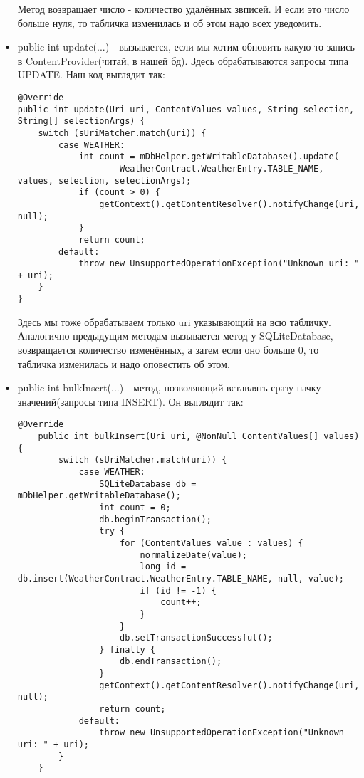 \documentclass[12 pt]{article}
\begin{document}
\begin{itemize}
	    Метод возвращает число - количество удалённых звписей. И если это число больше нуля, то табличка изменилась и об этом надо всех уведомить.
	    \item public int update(...) - вызывается, если мы хотим обновить какую-то запись в ContentProvider(читай, в нашей бд). Здесь обрабатываются запросы типа UPDATE.
	    Наш код выглядит так:
	    \begin{lstlisting}
@Override
public int update(Uri uri, ContentValues values, String selection, String[] selectionArgs) {
    switch (sUriMatcher.match(uri)) {
        case WEATHER:
            int count = mDbHelper.getWritableDatabase().update(
                    WeatherContract.WeatherEntry.TABLE_NAME, values, selection, selectionArgs);
            if (count > 0) {
                getContext().getContentResolver().notifyChange(uri, null);
            }
            return count;
        default:
            throw new UnsupportedOperationException("Unknown uri: " + uri);
    }
}	    
	    \end{lstlisting}
	    Здесь мы тоже обрабатываем только uri указывающий на всю табличку. Аналогично предыдущим методам вызывается метод у SQLiteDatabase, возвращается количество изменённых, а затем если оно больше 0, то табличка изменилась и надо оповестить об этом.
	    \item public int bulkInsert(...) - метод, позволяющий вставлять сразу пачку значений(запросы типа INSERT).
	    Он выглядит так:
	    \begin{lstlisting}
@Override
    public int bulkInsert(Uri uri, @NonNull ContentValues[] values) {
        switch (sUriMatcher.match(uri)) {
            case WEATHER:
                SQLiteDatabase db = mDbHelper.getWritableDatabase();
                int count = 0;
                db.beginTransaction();
                try {
                    for (ContentValues value : values) {
                        normalizeDate(value);
                        long id = db.insert(WeatherContract.WeatherEntry.TABLE_NAME, null, value);
                        if (id != -1) {
                            count++;
                        }
                    }
                    db.setTransactionSuccessful();
                } finally {
                    db.endTransaction();
                }
                getContext().getContentResolver().notifyChange(uri, null);
                return count;
            default:
                throw new UnsupportedOperationException("Unknown uri: " + uri);
        }
    }


\end{lstlisting}
\end{itemize}
\end{document}
